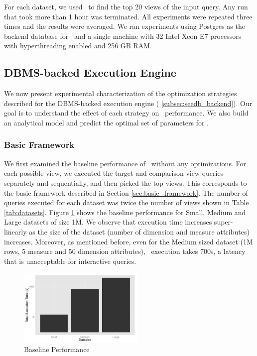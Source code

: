 For each dataset, we used \SeeDB\ to find the top 20 views of the input query.
Any run that took more than 1 hour was terminated. All experiments were repeated
three times and the results were averaged.
We ran experiments using Postgres as the backend database for \SeeDB\ and a single
machine with 32 Intel Xeon E7 processors with hyperthreading enabled and 256 GB
RAM.

\subsection{DBMS-backed Execution Engine}

We now present experimental characterization of the optimization
strategies described for the DBMS-backed execution engine (
\ref{subsec:seedb_backend}).
Our goal is to understand the effect of each strategy on \SeeDB\ performance. We
also build an analytical model and predict the optimal set of
parameters for \SeeDB.

\subsubsection{Basic Framework}
We first examined the baseline performance of \SeeDB\ without any optimizations.
For each possible view, we executed the target and comparison view queries
separately and sequentially, and then picked the top views. This corresponds to
the basic framework described in Section \ref{sec:basic_framework}. The number
of queries executed for each dataset was twice the number of views shown in
Table \ref{tab:datasets}. Figure \ref{fig:baseline_performance} shows the baseline
performance for Small, Medium and Large datasets of size 1M. We observe that
execution time increases super-linearly as the size of the dataset (number of dimension and
measure attributes) increases. Moreover, as mentioned before, even for the
Medium sized dataset (1M rows, 5 measure and 50 dimension attributes), \SeeDB\
execution takes 700s, a latency that is unacceptable for interactive queries.

\begin{figure}[h]
  \centering
    \includegraphics[width=6cm]{Images/baseline_performance.pdf}
    \caption{Baseline Performance} 
      \label{fig:baseline_performance}
\end{figure}

